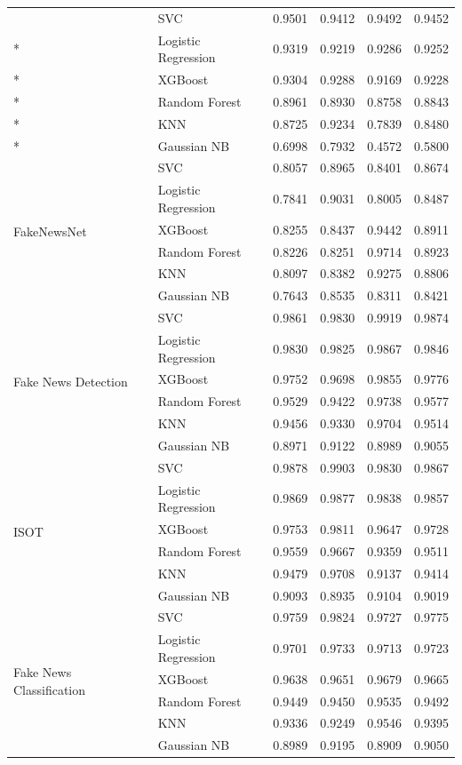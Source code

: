 \documentclass[stu,12pt,floatsintext,donotrepeattitle]{apa7}
\begin{document}
\begin{longtable}{@{} p{4.7cm} p{3.2cm} p{1.7cm} p{1.7cm} p{1.7cm} p{1.7cm} @{}}
\bottomrule
\endlastfoot
\multirow{6}{*}{WELFake} & SVC & 0.9501 & 0.9412 & 0.9492 & 0.9452 \\*
 & Logistic Regression & 0.9319 & 0.9219 & 0.9286 & 0.9252 \\*
 & XGBoost & 0.9304 & 0.9288 & 0.9169 & 0.9228 \\*
 & Random Forest & 0.8961 & 0.8930 & 0.8758 & 0.8843 \\*
 & KNN & 0.8725 & 0.9234 & 0.7839 & 0.8480 \\*
 & Gaussian NB & 0.6998 & 0.7932 & 0.4572 & 0.5800 \\
\midrule
\multirow{6}{*}{FakeNewsNet} & SVC & 0.8057 & 0.8965 & 0.8401 & 0.8674 \\*
 & Logistic Regression & 0.7841 & 0.9031 & 0.8005 & 0.8487 \\*
 & XGBoost & 0.8255 & 0.8437 & 0.9442 & 0.8911 \\*
 & Random Forest & 0.8226 & 0.8251 & 0.9714 & 0.8923 \\*
 & KNN & 0.8097 & 0.8382 & 0.9275 & 0.8806 \\*
 & Gaussian NB & 0.7643 & 0.8535 & 0.8311 & 0.8421 \\
\midrule
\multirow{6}{*}{Fake News Detection} & SVC & 0.9861 & 0.9830 & 0.9919 & 0.9874 \\*
 & Logistic Regression & 0.9830 & 0.9825 & 0.9867 & 0.9846 \\*
 & XGBoost & 0.9752 & 0.9698 & 0.9855 & 0.9776 \\*
 & Random Forest & 0.9529 & 0.9422 & 0.9738 & 0.9577 \\*
 & KNN & 0.9456 & 0.9330 & 0.9704 & 0.9514 \\*
 & Gaussian NB & 0.8971 & 0.9122 & 0.8989 & 0.9055 \\
\midrule
\multirow{6}{*}{ISOT} & SVC & 0.9878 & 0.9903 & 0.9830 & 0.9867 \\*
 & Logistic Regression & 0.9869 & 0.9877 & 0.9838 & 0.9857 \\*
 & XGBoost & 0.9753 & 0.9811 & 0.9647 & 0.9728 \\*
 & Random Forest & 0.9559 & 0.9667 & 0.9359 & 0.9511 \\*
 & KNN & 0.9479 & 0.9708 & 0.9137 & 0.9414 \\*
 & Gaussian NB & 0.9093 & 0.8935 & 0.9104 & 0.9019 \\
\midrule
\multirow{6}{*}{Fake News Classification} & SVC & 0.9759 & 0.9824 & 0.9727 & 0.9775 \\*
 & Logistic Regression & 0.9701 & 0.9733 & 0.9713 & 0.9723 \\*
 & XGBoost & 0.9638 & 0.9651 & 0.9679 & 0.9665 \\*
 & Random Forest & 0.9449 & 0.9450 & 0.9535 & 0.9492 \\*
 & KNN & 0.9336 & 0.9249 & 0.9546 & 0.9395 \\*
 & Gaussian NB & 0.8989 & 0.9195 & 0.8909 & 0.9050 \\
\end{longtable}
\endgroup
\end{document}
